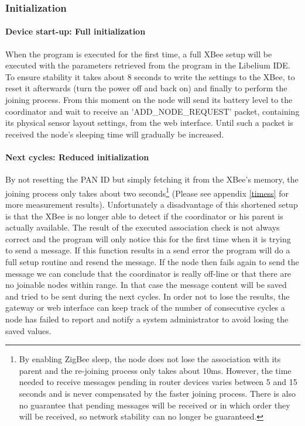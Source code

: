 \subsubsection{Initialization}
\label{initial}
\paragraph{Device start-up: Full initialization}
When the program is executed for the first time, a full XBee setup will be executed with the parameters retrieved from the program in the Libelium IDE. To ensure stability it takes about 8 seconds to write the settings to the XBee, to reset it afterwards (turn the power off and back on) and finally to perform the joining process. From this moment on the node will send its battery level to the coordinator and wait to receive an 'ADD\_NODE\_REQUEST' packet, containing its physical sensor layout settings, from the web interface. Until such a packet is received the node's sleeping time will gradually be increased.
\paragraph{Next cycles: Reduced initialization}
By not resetting the PAN ID but simply fetching it from the XBee's memory, the joining process only takes about two seconds\footnote{By enabling ZigBee sleep, the node does not lose the association with its parent and the re-joining process only takes about 10ms. However, the time needed to receive messages pending in router devices varies between 5 and 15 seconds and is never compensated by the faster joining process. There is also no guarantee that pending messages will be received or in which order they will be received, so network stability can no longer be guaranteed.} (Please see appendix \ref{timess} for more measurement results). Unfortunately a disadvantage of this shortened setup is that the XBee is no longer able to detect if the coordinator or his parent is actually available. The result of the executed association check is not always correct and the program will only notice this for the first time when it is trying to send a message. If this function results in a send error the program will do a full setup routine and resend the message. If the node then fails again to send the message we can conclude that the coordinator is really off-line or that there are no joinable nodes within range. In that case the message content will be saved and tried to be sent during the next cycles. In order not to lose the results, the gateway or web interface can keep track of the number of consecutive cycles a node has failed to report and notify a system administrator to avoid losing the saved values.

